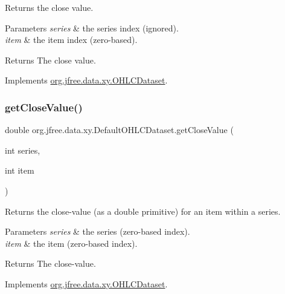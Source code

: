 Returns the close value.


\begin{DoxyParams}{Parameters}
{\em series} & the series index (ignored). \\
\hline
{\em item} & the item index (zero-\/based).\\
\hline
\end{DoxyParams}
\begin{DoxyReturn}{Returns}
The close value. 
\end{DoxyReturn}


Implements \mbox{\hyperlink{interfaceorg_1_1jfree_1_1data_1_1xy_1_1_o_h_l_c_dataset_a7c84699d1c3f6d5b4d1378d7b23d49ac}{org.\+jfree.\+data.\+xy.\+O\+H\+L\+C\+Dataset}}.

\mbox{\label{classorg_1_1jfree_1_1data_1_1xy_1_1_default_o_h_l_c_dataset_ae13de67fcd68bf22dd1436d5059212e7}} 
\subsubsection{\texorpdfstring{get\+Close\+Value()}{getCloseValue()}}
{\footnotesize\ttfamily double org.\+jfree.\+data.\+xy.\+Default\+O\+H\+L\+C\+Dataset.\+get\+Close\+Value (\begin{DoxyParamCaption}\item[{int}]{series,  }\item[{int}]{item }\end{DoxyParamCaption})}

Returns the close-\/value (as a double primitive) for an item within a series.


\begin{DoxyParams}{Parameters}
{\em series} & the series (zero-\/based index). \\
\hline
{\em item} & the item (zero-\/based index).\\
\hline
\end{DoxyParams}
\begin{DoxyReturn}{Returns}
The close-\/value. 
\end{DoxyReturn}


Implements \mbox{\hyperlink{interfaceorg_1_1jfree_1_1data_1_1xy_1_1_o_h_l_c_dataset_a5533f5d89de4aec9d67cfdc9289a1099}{org.\+jfree.\+data.\+xy.\+O\+H\+L\+C\+Dataset}}.

